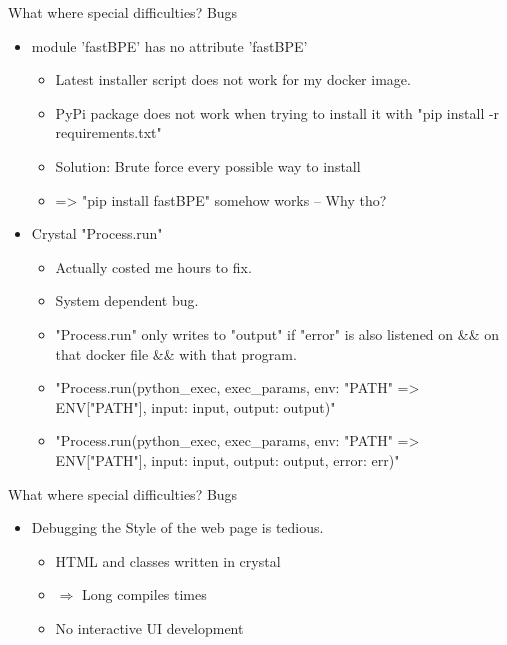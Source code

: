 \documentclass{beamer}
\begin{document}
	\begin{frame}[fragile]{What where special difficulties?}
		Bugs
		\begin{itemize}[<+->]
			\item module 'fastBPE' has no attribute 'fastBPE'
				\begin{itemize}
					\item Latest installer script does not work for my docker image.
					\item PyPi package does not work when trying to install it with "pip install -r requirements.txt"
					\item Solution: Brute force every possible way to install
					\item => "pip install fastBPE" somehow works \--- Why tho?
				\end{itemize}
			\item Crystal "Process.run"
				\begin{itemize}
					\item Actually costed me hours to fix.
					\item System dependent bug.
					\item "Process.run" only writes to "output" if "error" is also listened on \&\& on that docker file \&\& with that program.
					\item \color{red} "Process.run(python\_exec, exec\_params, env: {"PATH" => ENV["PATH"]}, input: input, output: output)"
					\item \color{green} "Process.run(python\_exec, exec\_params, env: {"PATH" => ENV["PATH"]}, input: input, output: output, error: err)" \color{black}
				\end{itemize}
		\end{itemize}
	\end{frame}
	\begin{frame}[fragile]{What where special difficulties?}
		Bugs
		\begin{itemize}
			\item Debugging the Style of the web page is tedious.
			\begin{itemize}[<+->]
				\item HTML and classes written in crystal
				\item \(\Rightarrow\) Long compiles times
				\item No interactive UI development
			\end{itemize}
		\end{itemize}
	\end{frame}
\end{document}
